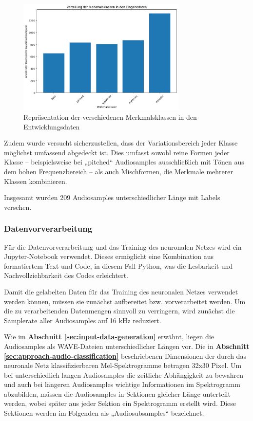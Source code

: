 \begin{figure}[h!]
\centering
\includegraphics[width=0.75\textwidth]{images/08_durchfuehrung/nn/class_spread_plot.png}
\caption{Repräsentation der verschiedenen Merkmalsklassen in den Entwicklungsdaten}
\label{fig:img-class-spread-graph}
\end{figure}

Zudem wurde versucht sicherzustellen, dass der Variationsbereich jeder Klasse möglichst umfassend abgedeckt ist. Dies umfasst sowohl reine Formen jeder Klasse – beispielsweise bei „pitched“ Audiosamples ausschließlich mit Tönen aus dem hohen Frequenzbereich – als auch Mischformen, die Merkmale mehrerer Klassen kombinieren.

Insgesamt wurden 209 Audiosamples unterschiedlicher Länge mit Labels versehen.

\subsubsection{Datenvorverarbeitung}
\label{sec:data-preprocessing}

Für die Datenvorverarbeitung und das Training des neuronalen Netzes wird ein Jupyter-Notebook verwendet. Dieses ermöglicht eine Kombination aus formatiertem Text und Code, in diesem Fall Python, was die Lesbarkeit und Nachvollziehbarkeit des Codes erleichtert.

Damit die gelabelten Daten für das Training des neuronalen Netzes verwendet werden können, müssen sie zunächst aufbereitet bzw. vorverarbeitet werden. Um die zu verarbeitenden Datenmengen sinnvoll zu verringern, wird zunächst die Samplerate aller Audiosamples auf 16 kHz reduziert.

Wie im \textbf{Abschnitt \ref{sec:input-data-generation}} erwähnt, liegen die Audiosamples als WAVE-Dateien unterschiedlicher Längen vor. Die in \textbf{Abschnitt \ref{sec:approach-audio-classification}} beschriebenen Dimensionen der durch das neuronale Netz klassifizierbaren Mel-Spektrogramme betragen 32x30 Pixel. Um bei unterschiedlich langen Audiosamples die zeitliche Abhängigkeit zu bewahren und auch bei längeren Audiosamples wichtige Informationen im Spektrogramm abzubilden, müssen die Audiosamples in Sektionen gleicher Länge unterteilt werden, wobei später aus jeder Sektion ein Spektrogramm erstellt wird. Diese Sektionen werden im Folgenden als „Audiosubsamples“ bezeichnet.


